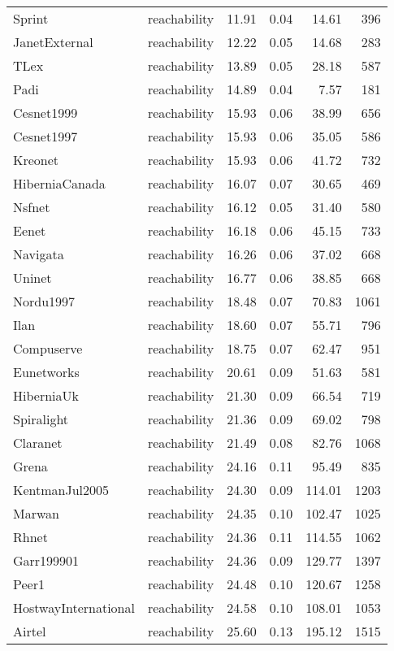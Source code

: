 \begin{tabular}{llrrrr}
Sprint & reachability & 11.91 & 0.04 & 14.61 & 396 \\
JanetExternal & reachability & 12.22 & 0.05 & 14.68 & 283 \\
TLex & reachability & 13.89 & 0.05 & 28.18 & 587 \\
Padi & reachability & 14.89 & 0.04 & 7.57 & 181 \\
Cesnet1999 & reachability & 15.93 & 0.06 & 38.99 & 656 \\
Cesnet1997 & reachability & 15.93 & 0.06 & 35.05 & 586 \\
Kreonet & reachability & 15.93 & 0.06 & 41.72 & 732 \\
HiberniaCanada & reachability & 16.07 & 0.07 & 30.65 & 469 \\
Nsfnet & reachability & 16.12 & 0.05 & 31.40 & 580 \\
Eenet & reachability & 16.18 & 0.06 & 45.15 & 733 \\
Navigata & reachability & 16.26 & 0.06 & 37.02 & 668 \\
Uninet & reachability & 16.77 & 0.06 & 38.85 & 668 \\
Nordu1997 & reachability & 18.48 & 0.07 & 70.83 & 1061 \\
Ilan & reachability & 18.60 & 0.07 & 55.71 & 796 \\
Compuserve & reachability & 18.75 & 0.07 & 62.47 & 951 \\
Eunetworks & reachability & 20.61 & 0.09 & 51.63 & 581 \\
HiberniaUk & reachability & 21.30 & 0.09 & 66.54 & 719 \\
Spiralight & reachability & 21.36 & 0.09 & 69.02 & 798 \\
Claranet & reachability & 21.49 & 0.08 & 82.76 & 1068 \\
Grena & reachability & 24.16 & 0.11 & 95.49 & 835 \\
KentmanJul2005 & reachability & 24.30 & 0.09 & 114.01 & 1203 \\
Marwan & reachability & 24.35 & 0.10 & 102.47 & 1025 \\
Rhnet & reachability & 24.36 & 0.11 & 114.55 & 1062 \\
Garr199901 & reachability & 24.36 & 0.09 & 129.77 & 1397 \\
Peer1 & reachability & 24.48 & 0.10 & 120.67 & 1258 \\
HostwayInternational & reachability & 24.58 & 0.10 & 108.01 & 1053 \\
Airtel & reachability & 25.60 & 0.13 & 195.12 & 1515 \\

\end{tabular}
